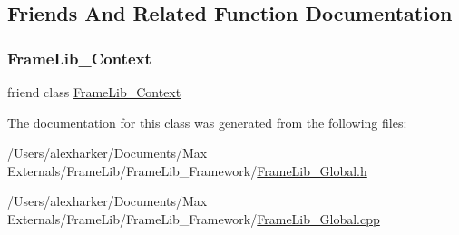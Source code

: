 \subsection{Friends And Related Function Documentation}
\mbox{\label{class_frame_lib___global_a6a4d0dd2956393d740d97600370f6ef8}} 
\subsubsection{\texorpdfstring{Frame\+Lib\+\_\+\+Context}{FrameLib\_Context}}
{\footnotesize\ttfamily friend class \hyperlink{class_frame_lib___context}{Frame\+Lib\+\_\+\+Context}\hspace{0.3cm}{\ttfamily [friend]}}



The documentation for this class was generated from the following files\+:\begin{DoxyCompactItemize}
\item 
/\+Users/alexharker/\+Documents/\+Max Externals/\+Frame\+Lib/\+Frame\+Lib\+\_\+\+Framework/\hyperlink{_frame_lib___global_8h}{Frame\+Lib\+\_\+\+Global.\+h}\item 
/\+Users/alexharker/\+Documents/\+Max Externals/\+Frame\+Lib/\+Frame\+Lib\+\_\+\+Framework/\hyperlink{_frame_lib___global_8cpp}{Frame\+Lib\+\_\+\+Global.\+cpp}\end{DoxyCompactItemize}
